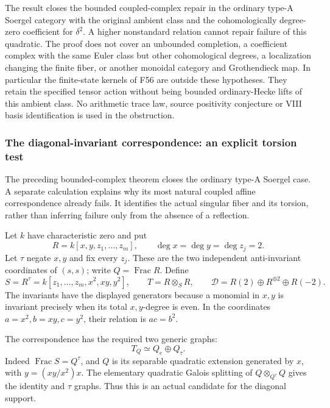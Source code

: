 \documentclass[11pt,a4paper]{article}
\newcommand{\mathscr}{\mathcal}
\newcommand{\fid}[1]{\textsf{#1}}\newcommand{\gate}[1]{\textsf{#1}}
\theoremstyle{named}\newtheorem{finding}{Finding}[section]
\theoremstyle{definition}\newtheorem{definition}[finding]{Definition}
\theoremstyle{remark}\newtheorem{remark}[finding]{Remark}
\begin{document}
The result closes the bounded coupled-complex repair in
the ordinary type-A Soergel category with the original
ambient class and the cohomologically degree-zero
coefficient for \(\delta^2\). A higher nonstandard
relation cannot repair failure of this quadratic.
The proof does not cover an unbounded completion, a
coefficient complex with the same Euler class but other
cohomological degrees, a localization changing the finite
fiber, or another monoidal category and Grothendieck map.
In particular the finite-state kernels of \fid{F56} are
outside these hypotheses. They retain the specified
tensor action without being bounded ordinary-Hecke
lifts of this ambient class. No arithmetic trace law,
source positivity conjecture or VIII basis identification
is used in the obstruction.

\subsubsection{The diagonal-invariant correspondence: an explicit torsion test}

The preceding bounded-complex theorem closes the ordinary type-A
Soergel case. A separate calculation explains why its most natural
coupled affine correspondence already fails. It identifies the
actual singular fiber and its torsion, rather than inferring failure
only from the absence of a reflection.

Let \(k\) have characteristic zero and put
\[
 R=k[x,y,z_1,\ldots,z_m],\qquad \deg x=\deg y=\deg z_j=2.
\]
Let \(\tau\) negate \(x,y\) and fix every \(z_j\). These are the two
independent anti-invariant coordinates of \((s,s)\); write
\(Q=\operatorname{Frac}R\). Define
\begin{equation}\label{eq:diagonalinvariantcandidate}
 S=R^\tau=k[z_1,\ldots,z_m,x^2,xy,y^2],
 \qquad T=R\otimes_S R,
 \qquad \mathscr D=R(2)\oplus R^{\oplus2}\oplus R(-2).
\end{equation}
The invariants have the displayed generators because a monomial
in \(x,y\) is invariant precisely when its total \(x,y\)-degree is
even. In the coordinates \(a=x^2,b=xy,c=y^2\), their relation is
\(ac=b^2\).

The correspondence has the required two generic graphs:
\[
                    T_Q\simeq Q_e\oplus Q_\tau.
\]
Indeed \(\operatorname{Frac}S=Q^\tau\), and \(Q\) is its separable
quadratic extension generated by \(x\), with
\(y=(xy/x^2)x\). The elementary quadratic Galois splitting of
\(Q\otimes_{Q^\tau}Q\) gives the identity and \(\tau\) graphs.
Thus this is an actual candidate for the diagonal support.
\end{document}
